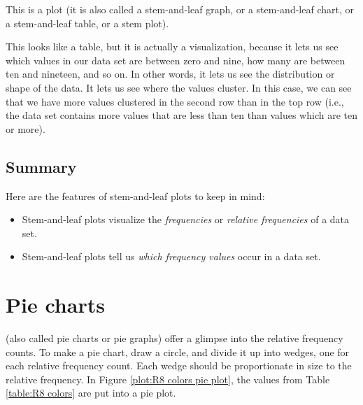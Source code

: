 \documentclass[../../../main.tex]{subfiles}
\begin{document}
This is a  plot (it is also called a stem-and-leaf graph, or a stem-and-leaf chart, or a stem-and-leaf table, or a stem plot).

This looks like a table, but it is actually a visualization, because it lets us see which values in our data set are between zero and nine, how many are between ten and nineteen, and so on. In other words, it lets us see the distribution or shape of the data. It lets us see where the values cluster. In this case, we can see that we have more values clustered in the second row than in the top row (i.e., the data set contains more values that are less than ten than values which are ten or more). 

\subsection{Summary}

Here are the features of stem-and-leaf plots to keep in mind:

\begin{itemize}
  
  \item Stem-and-leaf plots visualize the \emph{frequencies} or \emph{relative frequencies} of a data set.
  
  \item Stem-and-leaf plots tell us \emph{which frequency values} occur in a data set. 

\end{itemize}



\section{Pie charts}

 (also called pie charts or pie graphs) offer a glimpse into the relative frequency counts. To make a pie chart, draw a circle, and divide it up into wedges, one for each relative frequency count. Each wedge should be proportionate in size to the relative frequency. In Figure \ref{plot:R8 colors pie plot}, the values from Table \ref{table:R8 colors} are put into a pie plot.
\end{document}
